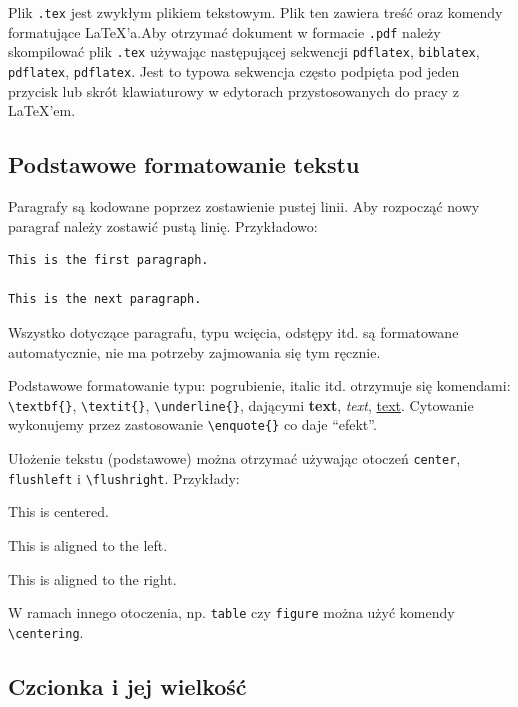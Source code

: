 \documentclass[polish, twoside, 12pt, a4paper]{article}
\theoremstyle{definition}
\theoremstyle{plain}
\theoremstyle{remark}
\begin{document}
Plik  \verb+.tex+ jest zwykłym plikiem tekstowym. Plik ten zawiera treść oraz komendy formatujące \LaTeX'a.Aby otrzymać dokument w formacie \verb+.pdf+ należy skompilować plik \verb+.tex+ używając następującej sekwencji \verb+pdflatex+, \verb+biblatex+, \verb+pdflatex+, \verb+pdflatex+. Jest to typowa sekwencja często podpięta pod jeden przycisk lub skrót klawiaturowy w edytorach przystosowanych do pracy z \LaTeX'em.

\subsection{Podstawowe formatowanie tekstu}

Paragrafy są kodowane poprzez zostawienie pustej linii. Aby rozpocząć nowy paragraf należy zostawić pustą linię. Przykładowo:
\begin{verbatim}
This is the first paragraph.

This is the next paragraph.
\end{verbatim}

Wszystko dotyczące paragrafu, typu wcięcia, odstępy itd. są formatowane automatycznie, nie ma potrzeby zajmowania się tym ręcznie.

Podstawowe formatowanie typu: pogrubienie, italic itd. otrzymuje się komendami: \verb+\textbf{}+, \verb+\textit{}+, \verb+\underline{}+, dającymi \textbf{text}, \textit{text}, \underline{text}. Cytowanie wykonujemy przez zastosowanie \verb+\enquote{}+ co daje \enquote{efekt}.

Ułożenie tekstu (podstawowe) można otrzymać używając otoczeń \verb+center+, \verb+flushleft+ i \verb+\flushright+. Przykłady:

\begin{center}
  This is centered.
\end{center}

\begin{flushleft}
  This is aligned to the left.
\end{flushleft}

\begin{flushright}
  This is aligned to the right.
\end{flushright}

W ramach innego otoczenia, np. \verb+table+ czy \verb+figure+ można użyć komendy \verb+\centering+.

\subsection{Czcionka i jej wielkość}
\end{document}
